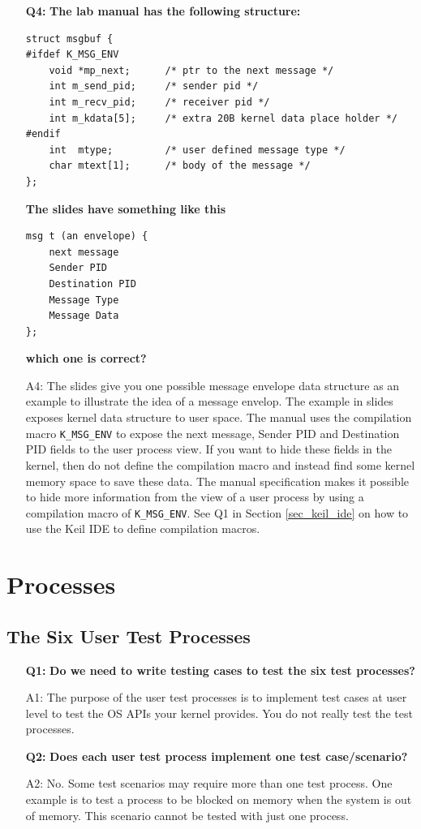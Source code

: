 \begin{itemize}
\item[{\bf Q4:}] {\bf The lab manual has the following structure:}
\begin{lstlisting}
struct msgbuf {
#ifdef K_MSG_ENV
    void *mp_next;      /* ptr to the next message */
    int m_send_pid;     /* sender pid */
    int m_recv_pid;     /* receiver pid */
    int m_kdata[5];     /* extra 20B kernel data place holder */
#endif
    int  mtype;         /* user defined message type */
    char mtext[1];      /* body of the message */
};
\end{lstlisting}
{\bf The slides have something like this}
\begin{lstlisting}
msg t (an envelope) {
    next message
    Sender PID
    Destination PID
    Message Type
    Message Data 
};
\end{lstlisting}
{\bf which one is correct?}
\item[A4:] The slides give you one possible message envelope data structure as an example to illustrate the idea of a message envelop. The example in slides exposes kernel data structure to user space. The manual uses the compilation macro \verb+K_MSG_ENV+ to expose the next message, Sender PID and Destination PID fields to the user process view. If you want to hide these fields in the kernel, then do not define the compilation macro and instead find some kernel memory space to save these data. The manual specification makes it possible to hide more information from the view of a user process by using a compilation macro of \verb+K_MSG_ENV+. See Q1 in Section \ref{sec_keil_ide} on how to use the Keil IDE to define compilation macros.

\end{itemize}

\section{Processes}

\subsection{The Six User Test Processes}
\begin{itemize}
\item[{\bf Q1:}] {\bf Do we need to write testing cases to test the six test processes?}
\item[A1:]
The purpose of the user test processes is to implement test cases at user level to test the OS APIs your kernel provides. You do not really test the test processes.

\item[{\bf Q2:}] {\bf Does each user test process implement one test case/scenario?}
\item[A2:]
No. Some test scenarios may require more than one test process. One example is to test a process to be blocked on memory when the system is out of memory. This scenario cannot be tested with just one process.

\end{itemize}

